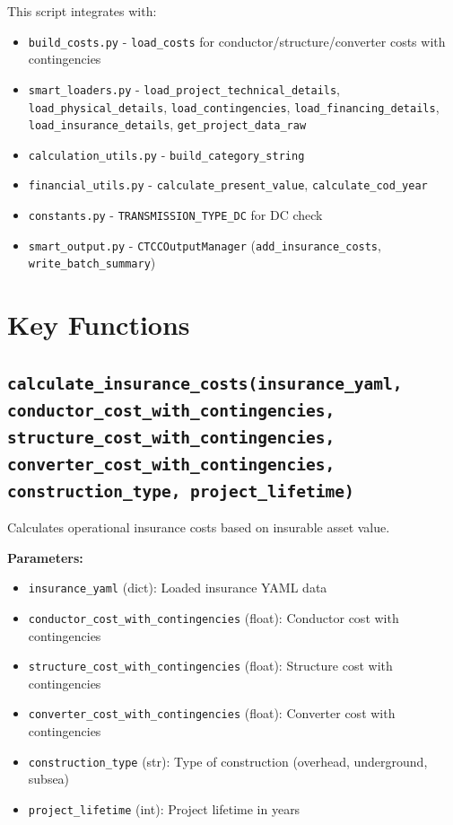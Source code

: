 \documentclass[ctcc_full_documentation.tex]{subfiles}
\begin{document}
This script integrates with:
\begin{itemize}
    \item \texttt{build\_costs.py} - \texttt{load\_costs} for conductor/structure/converter costs with contingencies
    \item \texttt{smart\_loaders.py} - \texttt{load\_project\_technical\_details}, \texttt{load\_physical\_details}, \texttt{load\_contingencies}, \texttt{load\_financing\_details}, \texttt{load\_insurance\_details}, \texttt{get\_project\_data\_raw}
    \item \texttt{calculation\_utils.py} - \texttt{build\_category\_string}
    \item \texttt{financial\_utils.py} - \texttt{calculate\_present\_value}, \texttt{calculate\_cod\_year}
    \item \texttt{constants.py} - \texttt{TRANSMISSION\_TYPE\_DC} for DC check
    \item \texttt{smart\_output.py} - \texttt{CTCCOutputManager} (\texttt{add\_insurance\_costs}, \texttt{write\_batch\_summary})
\end{itemize}

\section{Key Functions}

\subsection{\small\texttt{calculate\_insurance\_costs(insurance\_yaml, conductor\_cost\_with\_contingencies, structure\_cost\_with\_contingencies, converter\_cost\_with\_contingencies, construction\_type, project\_lifetime)}}

Calculates operational insurance costs based on insurable asset value.

\textbf{Parameters:}
\begin{itemize}
    \item \texttt{insurance\_yaml} (dict): Loaded insurance YAML data
    \item \texttt{conductor\_cost\_with\_contingencies} (float): Conductor cost with contingencies
    \item \texttt{structure\_cost\_with\_contingencies} (float): Structure cost with contingencies
    \item \texttt{converter\_cost\_with\_contingencies} (float): Converter cost with contingencies
    \item \texttt{construction\_type} (str): Type of construction (overhead, underground, subsea)
    \item \texttt{project\_lifetime} (int): Project lifetime in years
\end{itemize}
\end{document}
